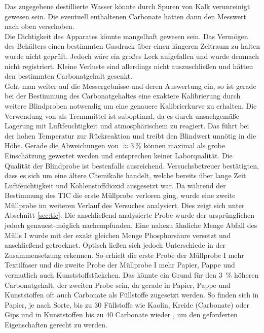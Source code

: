 Das zugegebene destillierte Wasser könnte durch Spuren von Kalk verunreinigt gewesen sein. Die eventuell enthaltenen Carbonate hätten dann den Messwert nach oben verschoben.\\
Die Dichtigkeit des Apparates könnte mangelhaft gewesen sein. Das Vermögen des Behälters einen bestimmten Gasdruck über einen längeren Zeitraum zu halten wurde nicht geprüft. Jedoch wäre ein großes Leck aufgefallen und wurde demnach nicht registriert. Kleine Verluste sind allerdings nicht auszuschließen und hätten den bestimmten Carbonatgehalt gesenkt.\\
\newpage
Geht man weiter auf die Messergebnisse und deren Auswertung ein, so ist gerade bei der Bestimmung des Carbonatgehaltes eine exaktere Kalibrierung durch weitere Blindproben notwendig um eine genauere Kalibrierkurve zu erhalten.
Die Verwendung von  als Trennmittel ist suboptimal, da es durch unsachgemäße Lagerung mit Luftfeuchtigkeit und atmosphärischem  zu  reagiert. Das führt bei der hohen Temperatur zur Rückreaktion und treibt den Blindwert unnötig in die Höhe. Gerade die Abweichungen von \mbox{$\approx \SI{3}{\percent}$} können maximal als grobe Einschätzung gewertet werden und entsprechen keiner Laborqualität. Die Qualität der Blindprobe ist bestenfalls ausreichend. Versuchsbetreuer bestätigten, dass es sich um eine ältere Chemikalie handelt, welche bereits über lange Zeit Luftfeuchtigkeit und Kohlenstoffdioxid ausgesetzt war. \linebreak
Da während der Bestimmung des TIC die erste Müllprobe verloren ging, wurde eine zweite Müllprobe im weiteren Verlauf des Versuches analysiert. Dies zeigt sich unter Abschnitt \ref{sec:tic}. Die anschließend analysierte Probe wurde der ursprünglichen jedoch genauest-möglich nachempfunden. Eine nahezu ähnliche Menge Abfall des Mülls I wurde mit der exakt gleichen Menge Phosphorsäure versetzt und anschließend getrocknet.
Optisch ließen sich jedoch Unterschiede in der Zusammensetzung erkennen. \linebreak So erhielt die erste Probe der Müllprobe I mehr Textilfaser und die zweite Probe der Müllprobe I mehr Papier, Pappe und vermutlich auch Kunststoffstückchen.\linebreak
Das könnte ein Grund für den \SI{3}{\percent} höheren Carbonatgehalt, der zweiten Probe sein, da gerade in Papier, Pappe und Kunststoffen oft auch Carbonate als Füllstoffe zugesetzt werden. So finden sich in Papier, je nach Sorte, bis zu \SI{30}{\mpercent} Füllstoffe wie Kaolin, Kreide (Carbonate) oder Gips \cite{Wikipedia.21.11.2019} und in Kunststoffen bis zu  \SI{40}{\mpercent} Carbonate wieder \cite{PolymerServiceGmbHMerseburg.13.08.2019}, um den geforderten Eigenschaften gerecht zu werden.\\
